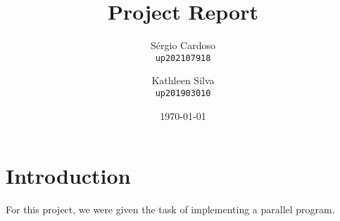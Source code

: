 \documentclass{article}
\title{Project Report}
\author{Sérgio Cardoso\\ 
    \texttt{up202107918} \and 
    Kathleen Silva\\ 
    \texttt{up201903010}}
\date{\today}
\begin{document}
\maketitle
\section{Introduction}
For this project, we were given the task of implementing 
a parallel program. 

\newpage
\newpage 
\newpage 
\newpage
\end{document}
